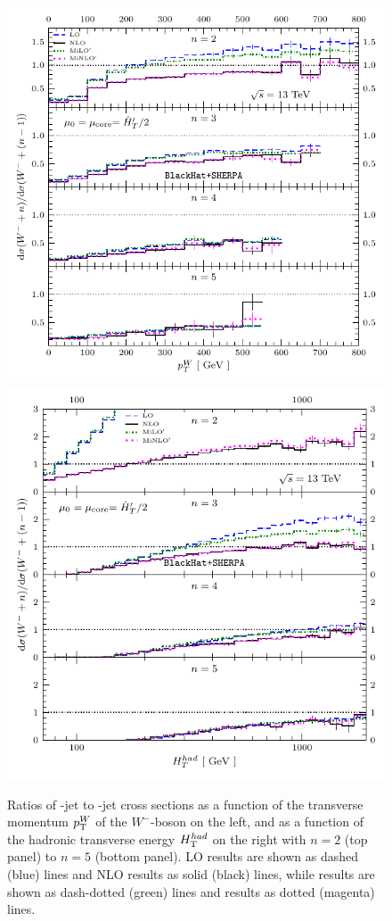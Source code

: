 \begin{figure}[t]

\includegraphics[clip,scale=0.75]{plots/jetratio_Wm_13TeV_anti-kt-R4-Pt30_PTe-veb_A}
\includegraphics[clip,scale=0.75]{plots/jetratio_Wm_13TeV_anti-kt-R4-Pt30_jets_HT_C}
\caption{Ratios of \Wmjn-jet to \Wmjnm-jet cross sections as a function of
the transverse momentum $p_{\textrm T}^W$ of the $W^-$-boson on the left, and as a function of
the hadronic transverse energy $H_{\textrm T}^{had}$ on the right with $n=2$
(top panel) to $n=5$ (bottom panel). LO results are shown as dashed (blue) lines and NLO results as solid
(black) lines, while \MILOp{} results are shown as dash-dotted
(green) lines and \MINLOp{} results as dotted (magenta) lines.
}
\label{fig_jetrat}
\end{figure}
